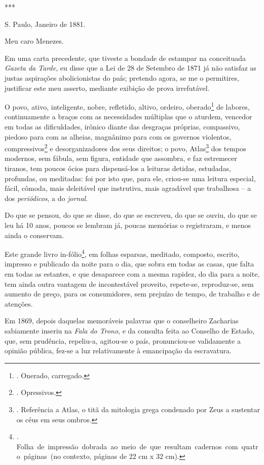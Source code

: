 ***

S. Paulo, Janeiro de 1881.

Meu caro Menezes.

Em uma carta precedente, que tiveste a bondade de estampar na
conceituada \emph{Gazeta da Tarde}, eu disse que a Lei de 28 de Setembro
de 1871 já não satisfaz as justas aspirações abolicionistas do país;
pretendo agora, se me o permitires, justificar este meu asserto,
mediante exibição de prova irrefutável.

O povo, ativo, inteligente, nobre, refletido, altivo, ordeiro,
oberado\footnote{. Onerado, carregado.} de labores, continuamente a
braços com as necessidades múltiplas que o aturdem, vencedor em todas as
dificuldades, irônico diante das desgraças próprias, compassivo, piedoso
para com as alheias, magnânimo para com os governos violentos,
compressivos\footnote{. Opressivos.} e desorganizadores dos seus
direitos; o povo, Atlas\footnote{. Referência a Atlas, o titã da
  mitologia grega condenado por Zeus a sustentar os céus em seus ombros.}
dos tempos modernos, sem fábula, sem figura, entidade que assombra, e
faz estremecer tiranos, tem poucos ócios para dispensá-los a leituras
detidas, estudadas, profundas, ou meditadas: foi por isto que, para ele,
criou-se uma leitura especial, fácil, cômoda, mais deleitável que
instrutiva, mais agradável que trabalhosa -- a dos \emph{periódicos}, a
do \emph{jornal}.

Do que se pensou, do que se disse, do que se escreveu, do que se ouviu,
do que se leu há 10 anos, poucos se lembram já, poucas memórias o
registraram, e menos ainda o conservam.

Este grande livro in-fólio\footnote{.
  Folha~de~impressão~dobrada~ao~meio~de~que~resultam~cadernos~com~quatro~páginas~(no
  contexto, páginas de 22 cm x 32 cm).}, em folhas esparsas, meditado,
composto, escrito, impresso e publicado da noite para o dia, que sobra
em todas as casas, que falta em todas as estantes, e que desaparece com
a mesma rapidez, do dia para a noite, tem ainda outra vantagem de
incontestável proveito, repete-se, reproduz-se, sem aumento de preço,
para os consumidores, sem prejuízo de tempo, de trabalho e de atenções.

Em 1869, depois daquelas memoráveis palavras que o conselheiro Zacharias
sabiamente inseriu na \emph{Fala do Trono}, e da consulta feita ao
Conselho de Estado, que, sem prudência, repeliu-a, agitou-se o país,
pronunciou-se validamente a opinião pública, fez-se a luz relativamente
à emancipação da escravatura.

